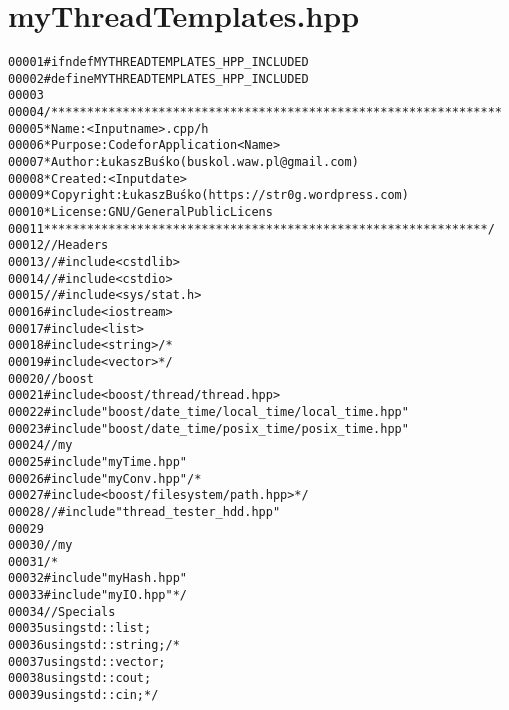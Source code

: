 \hypertarget{myThreadTemplates_8hpp_source}{
\section{myThreadTemplates.hpp}
}


\begin{footnotesize}\begin{alltt}
00001 \textcolor{preprocessor}{#ifndef MYTHREADTEMPLATES\_HPP\_INCLUDED}
00002 \textcolor{preprocessor}{}\textcolor{preprocessor}{#define MYTHREADTEMPLATES\_HPP\_INCLUDED}
00003 \textcolor{preprocessor}{}
00004 \textcolor{comment}{/***************************************************************}
00005 \textcolor{comment}{ * Name:      <Input name>.cpp/h}
00006 \textcolor{comment}{ * Purpose:   Code for Application <Name>}
00007 \textcolor{comment}{ * Author:    Łukasz Buśko (buskol.waw.pl@gmail.com)}
00008 \textcolor{comment}{ * Created:   <Input date>}
00009 \textcolor{comment}{ * Copyright: Łukasz Buśko (https://str0g.wordpress.com)}
00010 \textcolor{comment}{ * License:   GNU / General Public Licens}
00011 \textcolor{comment}{ **************************************************************/}
00012 \textcolor{comment}{//Headers}
00013 \textcolor{comment}{//#include <cstdlib>}
00014 \textcolor{comment}{//#include <cstdio>}
00015 \textcolor{comment}{//#include <sys/stat.h>}
00016 \textcolor{preprocessor}{#include <iostream>}
00017 \textcolor{preprocessor}{#include <list>}
00018 \textcolor{preprocessor}{#include <string>}\textcolor{comment}{/*}
00019 \textcolor{comment}{#include <vector>*/}
00020 \textcolor{comment}{//boost}
00021 \textcolor{preprocessor}{#include <boost/thread/thread.hpp>}
00022 \textcolor{preprocessor}{#include "boost/date\_time/local\_time/local\_time.hpp"}
00023 \textcolor{preprocessor}{#include "boost/date\_time/posix\_time/posix\_time.hpp"}
00024 \textcolor{comment}{//my}
00025 \textcolor{preprocessor}{#include "myTime.hpp"}
00026 \textcolor{preprocessor}{#include "myConv.hpp"}\textcolor{comment}{/*}
00027 \textcolor{comment}{#include <boost/filesystem/path.hpp>*/}
00028 \textcolor{comment}{//#include "thread\_tester\_hdd.hpp"}
00029 
00030 \textcolor{comment}{//my}
00031 \textcolor{comment}{/*}
00032 \textcolor{comment}{#include "myHash.hpp"}
00033 \textcolor{comment}{#include "myIO.hpp"*/}
00034 \textcolor{comment}{//Specials}
00035 \textcolor{keyword}{using} std::list;
00036 \textcolor{keyword}{using} std::string;\textcolor{comment}{/*}
00037 \textcolor{comment}{using std::vector;}
00038 \textcolor{comment}{using std::cout;}
00039 \textcolor{comment}{using std::cin;*/}

\end{alltt}
\end{footnotesize}
